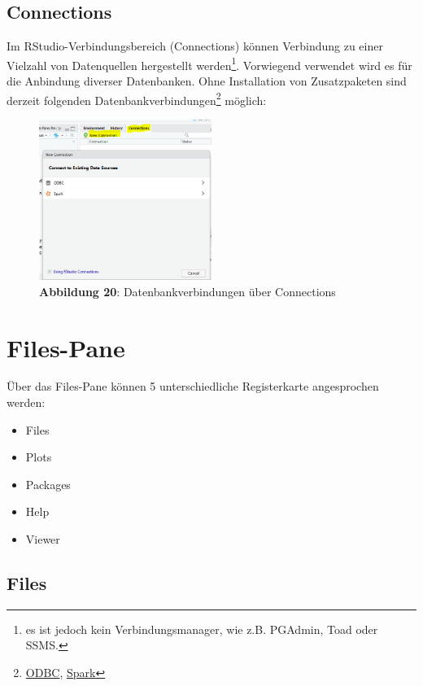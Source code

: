 \documentclass[]{article}
\providecommand{\tightlist}{%
  \setlength{\itemsep}{0pt}\setlength{\parskip}{0pt}}
\let\rmarkdownfootnote\footnote%
\def\footnote{\protect\rmarkdownfootnote}
\begin{document}
\subsection*{Connections}\label{connections}

Im RStudio-Verbindungsbereich (Connections) können Verbindung zu einer
Vielzahl von Datenquellen hergestellt werden\footnote{es ist jedoch kein
  Verbindungsmanager, wie z.B. PGAdmin, Toad oder SSMS.}. Vorwiegend
verwendet wird es für die Anbindung diverser Datenbanken. Ohne
Installation von Zusatzpaketen sind derzeit folgenden
Datenbankverbindungen\footnote{\href{https://de.wikipedia.org/wiki/Open_Database_Connectivity}{ODBC},
  \href{https://de.wikipedia.org/wiki/Apache_Spark}{Spark}} möglich:

\begin{figure}
\centering
\includegraphics[width=0.50000\textwidth]{Images/04_Connections.PNG}
\caption{\textbf{Abbildung 20}: Datenbankverbindungen über Connections}
\end{figure}

\section{Files-Pane}\label{files-pane}

Über das Files-Pane können 5 unterschiedliche Registerkarte angesprochen
werden:

\begin{itemize}
\tightlist
\item
  Files
\item
  Plots
\item
  Packages
\item
  Help
\item
  Viewer
\end{itemize}

\subsection*{Files}\label{files}
\end{document}
